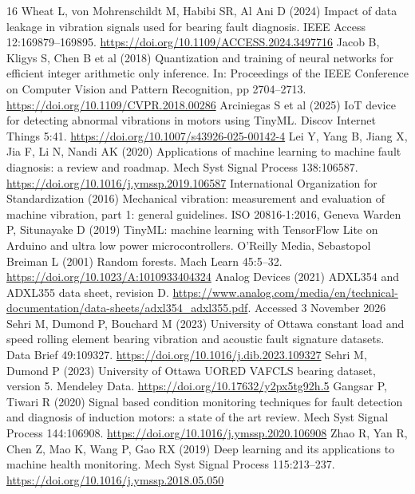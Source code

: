 \documentclass[10pt,twocolumn]{article}
\begin{document}
\begin{thebibliography}{16}
 Wheat L, von Mohrenschildt M, Habibi SR, Al Ani D (2024) Impact of data leakage in vibration signals used for bearing fault diagnosis. IEEE Access 12:169879--169895. \url{https://doi.org/10.1109/ACCESS.2024.3497716}
 Jacob B, Kligys S, Chen B et al (2018) Quantization and training of neural networks for efficient integer arithmetic only inference. In: Proceedings of the IEEE Conference on Computer Vision and Pattern Recognition, pp 2704--2713. \url{https://doi.org/10.1109/CVPR.2018.00286}
 Arciniegas S et al (2025) IoT device for detecting abnormal vibrations in motors using TinyML. Discov Internet Things 5:41. \url{https://doi.org/10.1007/s43926-025-00142-4}
 Lei Y, Yang B, Jiang X, Jia F, Li N, Nandi AK (2020) Applications of machine learning to machine fault diagnosis: a review and roadmap. Mech Syst Signal Process 138:106587. \url{https://doi.org/10.1016/j.ymssp.2019.106587}
 International Organization for Standardization (2016) Mechanical vibration: measurement and evaluation of machine vibration, part 1: general guidelines. ISO 20816-1:2016, Geneva
 Warden P, Situnayake D (2019) TinyML: machine learning with TensorFlow Lite on Arduino and ultra low power microcontrollers. O'Reilly Media, Sebastopol
 Breiman L (2001) Random forests. Mach Learn 45:5--32. \url{https://doi.org/10.1023/A:1010933404324}
 Analog Devices (2021) ADXL354 and ADXL355 data sheet, revision D. \url{https://www.analog.com/media/en/technical-documentation/data-sheets/adxl354_adxl355.pdf}. Accessed 3 November 2026
 Sehri M, Dumond P, Bouchard M (2023) University of Ottawa constant load and speed rolling element bearing vibration and acoustic fault signature datasets. Data Brief 49:109327. \url{https://doi.org/10.1016/j.dib.2023.109327}
 Sehri M, Dumond P (2023) University of Ottawa UORED VAFCLS bearing dataset, version 5. Mendeley Data. \url{https://doi.org/10.17632/y2px5tg92h.5}
 Gangsar P, Tiwari R (2020) Signal based condition monitoring techniques for fault detection and diagnosis of induction motors: a state of the art review. Mech Syst Signal Process 144:106908. \url{https://doi.org/10.1016/j.ymssp.2020.106908}
 Zhao R, Yan R, Chen Z, Mao K, Wang P, Gao RX (2019) Deep learning and its applications to machine health monitoring. Mech Syst Signal Process 115:213--237. \url{https://doi.org/10.1016/j.ymssp.2018.05.050}

\end{thebibliography}
\end{document}
